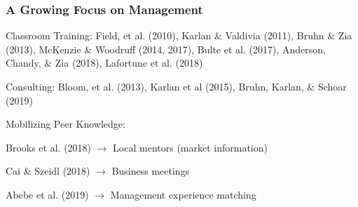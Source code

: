 \documentclass[hideothersubsections, usenames,dvipsnames,11pt]{beamer}
\newenvironment{itemize_2pt}{\itemize\addtolength{\itemsep}{2pt}}{\enditemize}
\begin{document}
\begin{frame}
\frametitle{A Growing Focus on Management}
\begin{itemize_2pt}
\item \textcolor{bdf}{Classroom Training}: \textcolor{camel}{Field, et al. (2010), Karlan \& Valdivia (2011), Bruhn \& Zia (2013), McKenzie \& Woodruff (2014, 2017), Bulte et al. (2017), Anderson, Chandy, \& Zia (2018), Lafortune et al. (2018)}
\vspace{0.1in}
\item \textcolor{bdf}{Consulting}: \textcolor{camel}{Bloom, et al. (2013), Karlan et al (2015), Bruhn, Karlan, \& Schoar (2019)}
\vspace{0.1in}

\item \textcolor{bdf}{Mobilizing Peer Knowledge}:
    \begin{itemize_2pt}
    \item \textcolor{camel}{Brooks et al. (2018)} $\rightarrow$ Local mentors (market information)
    \item \textcolor{camel}{Cai \& Szeidl (2018)} $\rightarrow$ Business meetings
    \item \textcolor{camel}{Abebe et al. (2019)} $\rightarrow$ Management experience matching
    \end{itemize_2pt}
    \vspace{0.1in}
\end{itemize_2pt}
\end{frame}
\end{document}
